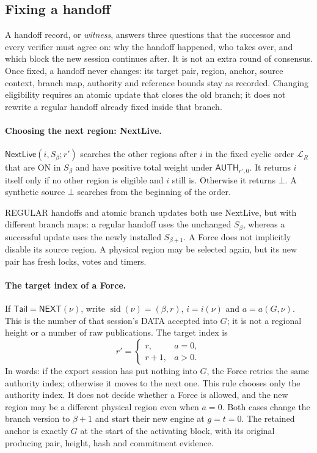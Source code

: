 \documentclass[11pt,a4paper]{article}
\newcommand{\tagg}[1]{\ensuremath{\mathsf{#1}}}
\newcommand{\defterm}[1]{\textcolor{rrBlue}{\textit{#1}}}
\begin{document}
\subsection{Fixing a handoff}
\label{sec:witness}
A handoff record, or \defterm{witness}, answers three questions that the
successor and every verifier must agree on: why the handoff happened,
who takes over, and which block the new session continues after. It is
not an extra round of consensus. Once fixed, a handoff never changes:
its target pair, region, anchor, source context, branch map, authority and
reference bounds stay as recorded. Changing eligibility requires an
atomic update that closes the old branch; it does not rewrite a regular
handoff already fixed inside that branch.

\paragraph{Choosing the next region: NextLive.}
$\tagg{NextLive}(i,S_\beta;r')$ searches the other regions after $i$ in
the fixed cyclic order $\mathcal L_R$ that are ON in $S_\beta$ and have
positive total weight under $\tagg{AUTH}_{r',0}$. It
returns $i$ itself only if no other region is eligible and $i$ still is.
Otherwise it returns $\bot$. A synthetic source $\bot$ searches from the
beginning of the order.

REGULAR handoffs and atomic branch updates both use NextLive, but with
different branch maps: a regular handoff uses the unchanged $S_\beta$,
whereas a successful update uses the newly installed $S_{\beta+1}$. A
Force does not implicitly disable its source region. A physical
region may be selected again, but its new pair has fresh locks, votes and
timers.


\paragraph{The target index of a Force.}
\label{sec:retry-slot}
If $\mathsf{Tail}=\tagg{NEXT}(\nu)$, write
$\operatorname{sid}(\nu)=(\beta,r)$, $i=i(\nu)$ and
$a=a(G,\nu)$.  This is the number of that session's DATA accepted into
$G$; it is not a regional height or a number of raw publications. The
target index is
\[
 r'=
 \begin{cases}
 r,&a=0,\\
 r+1,&a>0.
 \end{cases}
\]
In words: if the export session has put nothing into $G$, the Force
retries the same authority index; otherwise it moves to the next one.
This rule chooses only the authority index. It does not decide whether a
Force is allowed, and the new region may be a different physical region
even when $a=0$. Both cases change the branch version to $\beta+1$ and
start their new engine at $g=t=0$. The retained anchor is exactly $G$ at
the start of the activating block, with its original producing pair,
height, hash and commitment evidence.
\end{document}
